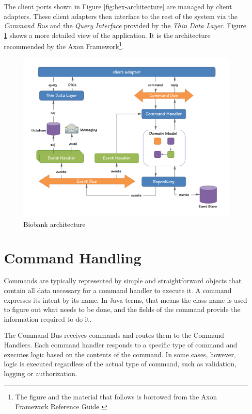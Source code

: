 The client ports shown in Figure \ref{fig:hex-architecture} are managed by
client adapters. These client adapters then interface to the rest of the system
via the \emph{Command Bus} and the \emph{Query Interface} provided by the
\emph{Thin Data Layer}. Figure \ref{fig:cqrs-architecture} shows a more detailed
view of the application. It is the architecture recommended by the Axon
Framework\footnote{The figure and the material that follows is borrowed from
  the Axon Framework Reference Guide \cite{AxonOnline}}.

\begin{figure}[H]
  \begin{center}
    \includegraphics[trim={10mm 5mm 15mm 10mm}, clip, width=1\textwidth]
		    {images/cqrs-architecture}
    \caption{Biobank architecture}
    \label{fig:cqrs-architecture}
  \end{center}
\end{figure}

\section*{Command Handling}

Commands are typically represented by simple and straightforward objects that
contain all data necessary for a command handler to execute it. A command
expresses its intent by its name. In Java terms, that means the class name is
used to figure out what needs to be done, and the fields of the command provide
the information required to do it.

The Command Bus receives commands and routes them to the Command Handlers. Each
command handler responds to a specific type of command and executes logic based
on the contents of the command. In some cases, however, logic is executed
regardless of the actual type of command, such as validation, logging or
authorization.

